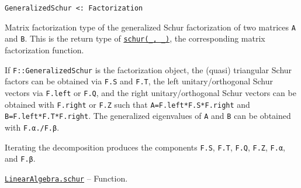 \begin{adjustwidth}{2em}{0pt}


\begin{verbatim}
GeneralizedSchur <: Factorization
\end{verbatim}

Matrix factorization type of the generalized Schur factorization of two matrices \texttt{A} and \texttt{B}. This is the return type of \hyperlink{17132870828407138368}{\texttt{schur(\_, \_)}}, the corresponding matrix factorization function.

If \texttt{F::GeneralizedSchur} is the factorization object, the (quasi) triangular Schur factors can be obtained via \texttt{F.S} and \texttt{F.T}, the left unitary/orthogonal Schur vectors via \texttt{F.left} or \texttt{F.Q}, and the right unitary/orthogonal Schur vectors can be obtained with \texttt{F.right} or \texttt{F.Z} such that \texttt{A=F.left*F.S*F.right{\textquotesingle}} and \texttt{B=F.left*F.T*F.right{\textquotesingle}}. The generalized eigenvalues of \texttt{A} and \texttt{B} can be obtained with \texttt{F.α./F.β}.

Iterating the decomposition produces the components \texttt{F.S}, \texttt{F.T}, \texttt{F.Q}, \texttt{F.Z}, \texttt{F.α}, and \texttt{F.β}.



\end{adjustwidth}
\hypertarget{17132870828407138368}{}
\hyperlink{17132870828407138368}{\texttt{LinearAlgebra.schur}}  -- {Function.}

